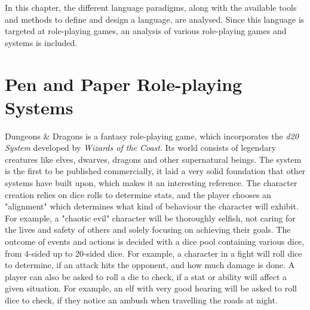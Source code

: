In this chapter, the different language paradigms, along with the available tools and methods to define and design a language, are analysed. Since this language is targeted at role-playing games, an analysis of various role-playing games and systems is included.

\begin{comment}
\section{Analysis of Role-playing systems}

As mention the basic idea of a role-playing game is interactive story-telling. The game consists of several players and a \ac{gm}. The \ac{gm} is the mastermind behind the story being acted out, called the scenario. They are in charge of writing the plot of the scenario, and guiding the players through it, all the while allowing them to shape the individual encounters and scenes, but maintaining the greater story-arc. The players receive points for their characters surviving battles, using skills or sometimes as a reward to the player for excellent roleplaying of the character. Often dice are used to introduce randomness in determining the outcome of actions. The use of dice is incorporated into popular role-playing systems like Dungeons \& Dragons (DnD) and World of Darkness (WoD), both very popular pen and paper roleplaying systems.
\end{comment}

\section{Pen and Paper Role-playing Systems}

Dungeons \& Dragons is a fantasy role-playing game, which incorporates the \emph{d20 System}\cite{d20sys} developed by \emph{Wizards of the Coast}.
Its world consists of legendary creatures like elves, dwarves, dragons and other supernatural beings. The system is the first to be published commercially, it laid a very solid foundation that other systems have built upon, which makes it an interesting reference. The character creation relies on dice rolls to determine stats, and the player chooses an "alignment" which determines what kind of behaviour the character will exhibit. For example, a "chaotic evil" character will be thoroughly selfish, not caring for the lives and safety of others and solely focusing on achieving their goals.
The outcome of events and actions is decided with a dice pool containing various dice, from 4-sided up to 20-sided dice. For example, a character in a fight will roll dice to determine, if an attack hits the opponent, and how much damage is done. A player can also be asked to roll a die to check, if a stat or ability will affect a given situation. For example, an elf with very good hearing will be asked to roll dice to check, if they notice an ambush when travelling the roads at night.\cite{dnd}


